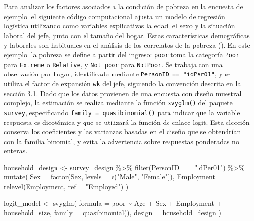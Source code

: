 \documentclass[
  spanish,
  11pt,
  letterpaper,
  oneside,
  open=any]{scrbook}
\newenvironment{Shaded}{\begin{snugshade}}{\end{snugshade}}
\newcommand{\AttributeTok}[1]{\textcolor[rgb]{0.40,0.45,0.13}{#1}}
\newcommand{\FunctionTok}[1]{\textcolor[rgb]{0.28,0.35,0.67}{#1}}
\newcommand{\NormalTok}[1]{\textcolor[rgb]{0.00,0.23,0.31}{#1}}
\newcommand{\OtherTok}[1]{\textcolor[rgb]{0.00,0.23,0.31}{#1}}
\newcommand{\SpecialCharTok}[1]{\textcolor[rgb]{0.37,0.37,0.37}{#1}}
\newcommand{\StringTok}[1]{\textcolor[rgb]{0.13,0.47,0.30}{#1}}
\begin{document}
Para analizar los factores asociados a la condición de pobreza en la
encuesta de ejemplo, el siguiente código computacional ajusta un modelo
de regresión logística utilizando como variables explicativas la edad,
el sexo y la situación laboral del jefe, junto con el tamaño del hogar.
Estas características demográficas y laborales son habituales en el
análisis de los correlatos de la pobreza
(). En este ejemplo, la pobreza
se define a partir del ingreso: \texttt{poor} toma la categoría
\texttt{Poor} para \texttt{Extreme} o \texttt{Relative}, y
\texttt{Not\ poor} para \texttt{NotPoor}. Se trabaja con una observación
por hogar, identificada mediante \texttt{PersonID\ ==\ "idPer01"}, y se
utiliza el factor de expansión \texttt{wk} del jefe, siguiendo la
convención descrita en la sección 3.1. Dado que los datos provienen de
una encuesta con diseño muestral complejo, la estimación se realiza
mediante la función \texttt{svyglm()} del paquete \texttt{survey},
especificando \texttt{family\ =\ quasibinomial()} para indicar que la
variable respuesta es dicotómica y que se utilizará la función de enlace
logit. Esta elección conserva los coeficientes y las varianzas basadas
en el diseño que se obtendrían con la familia binomial, y evita la
advertencia sobre respuestas ponderadas no enteras.

\begin{Shaded}
\begin{Highlighting}[]
\NormalTok{household\_design }\OtherTok{\textless{}{-}}\NormalTok{ survey\_design }\SpecialCharTok{\%\textgreater{}\%}
  \FunctionTok{filter}\NormalTok{(PersonID }\SpecialCharTok{==} \StringTok{"idPer01"}\NormalTok{) }\SpecialCharTok{\%\textgreater{}\%}
  \FunctionTok{mutate}\NormalTok{(}
    \AttributeTok{Sex =} \FunctionTok{factor}\NormalTok{(Sex, }\AttributeTok{levels =} \FunctionTok{c}\NormalTok{(}\StringTok{"Male"}\NormalTok{, }\StringTok{"Female"}\NormalTok{)),}
    \AttributeTok{Employment =} \FunctionTok{relevel}\NormalTok{(Employment, }\AttributeTok{ref =} \StringTok{"Employed"}\NormalTok{)}
\NormalTok{  )}

\NormalTok{logit\_model }\OtherTok{\textless{}{-}} \FunctionTok{svyglm}\NormalTok{(}
  \AttributeTok{formula =}\NormalTok{ poor }\SpecialCharTok{\textasciitilde{}}\NormalTok{ Age }\SpecialCharTok{+}\NormalTok{ Sex }\SpecialCharTok{+}\NormalTok{ Employment }\SpecialCharTok{+}\NormalTok{ household\_size,}
  \AttributeTok{family =} \FunctionTok{quasibinomial}\NormalTok{(),}
  \AttributeTok{design =}\NormalTok{ household\_design}
\NormalTok{)}
\end{Highlighting}
\end{Shaded}
\end{document}
